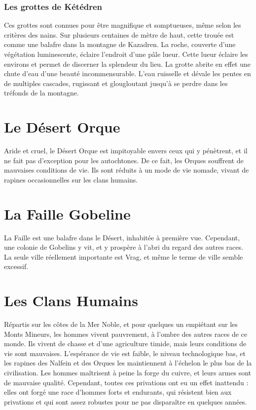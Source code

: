 \subsubsection{Les grottes de Kétédren}
Ces grottes sont connues pour être magnifique et somptueuses, même selon les critères des nains. Sur plusieurs centaines de mètre de haut, cette trouée est comme une balafre dans la montagne de Kazadren. La roche, couverte d'une végétation luminescente, éclaire l'endroit d'une pâle lueur. Cette lueur éclaire les environs et permet de discerner la splendeur du lieu. La grotte abrite en effet une chute d'eau d'une beauté incommensurable. L'eau ruisselle et dévale les pentes en de multiples cascades, rugissant et glougloutant jusqu'à se perdre dans les tréfonds de la montagne.
\section{Le Désert Orque}
Aride et cruel, le Désert Orque est impitoyable envers ceux qui y pénètrent, et il ne fait pas d'exception pour les autochtones. De ce fait, les Orques souffrent de mauvaises conditions de vie. Ils sont réduits à un mode de vie nomade, vivant de rapines occasionnelles sur les clans humains.
\section{La Faille Gobeline}
La Faille est une balafre dans le Désert, inhabitée à première vue. Cependant, une colonie de Gobelins y vit, et y prospère à l'abri du regard des autres races. La seule ville réellement importante est Vrag, et même le terme de ville semble excessif.
\section{Les Clans Humains}
Répartis sur les côtes de la Mer Noble, et pour quelques un empiétant sur les Monts Mineurs, les hommes vivent pauvrement, à l'ombre des autres races de ce monde. Ils vivent de chasse et d'une agriculture timide, mais leurs conditions de vie sont mauvaises. L'espérance de vie est faible, le niveau technologique bas, et les rapines des Nalfein et des Orques les maintiennent à l'échelon le plus bas de la civilisation. Les hommes maîtrisent à peine la forge du cuivre, et leurs armes sont de mauvaise qualité. Cependant, toutes ces privations ont eu un effet inattendu : elles ont forgé une race d'hommes forts et endurants, qui résistent bien aux privations et qui sont assez robustes pour ne pas disparaître en quelques années.
